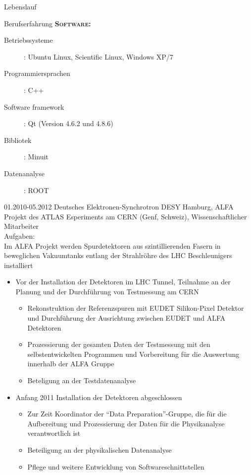 \documentclass[11pt,a4paper]{scrartcl}
\begin{document}
\begin{cv}{Lebenslauf}
\begin{cvlist}{Berufserfahrung}
      {\scshape {\bfseries Software:}}
      \begin{description} 
      \item[Betriebssysteme] : Ubuntu Linux, Scientific Linux, Windows
        XP/7
      \item[Programmiersprachen] : C++
      \item[Software framework] : Qt (Version 4.6.2 und 4.8.6)
      \item[Bibliotek] : Minuit
      \item[Datenanalyse] : ROOT
      \end{description}
    
  \item[01.2010-05.2012] Deutsches Elektronen-Synchrotron DESY
    Hamburg, ALFA Projekt des ATLAS Esperiments am CERN (Genf,
    Schweiz), Wissenschaftlicher Mitarbeiter \\
    
    Aufgaben:\\
    
    Im ALFA Projekt werden Spurdetektoren aus szintillierenden Fasern
    in beweglichen Vakuumtanks entlang der Strahlr{\"o}hre des LHC
    Beschleunigers installiert
    \begin{itemize}
    \item Vor der Installation der Detektoren im LHC Tunnel, Teilnahme
      an der Planung und der Durchf{\"u}hrung von Testmessung am CERN
      \begin{itemize}
      \item Rekonstruktion der Referenzspuren mit EUDET Silikon-Pixel
        Detektor und Durchf{\"u}hrung der Ausrichtung zwischen EUDET
        und ALFA Detektoren 
      \item Prozessierung der gesamten Daten der Testmessung mit den
        selbstentwickelten Programmen und Vorbereitung f{\"u}r die
        Auswertung innerhalb der ALFA Gruppe
      \item Beteligung an der Testdatenanalyse
      \end{itemize}           
    \item Anfang 2011 Installation der Detektoren abgeschlossen
      \begin{itemize}
      \item Zur Zeit Koordinator der "`Data Preparation"'-Gruppe, die
        f{\"u}r die Aufbereitung und Prozessierung der Daten f{\"u}r
        die Physikanalyse verantwortlich ist
      \item Beteiligung an der physikalischen Datenanalyse
      \item Pflege und weitere Entwicklung von Softwareschnittstellen
      \end{itemize} 
    \end{itemize}


\end{cvlist}
\end{cv}
\end{document}
